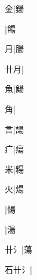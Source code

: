 \begin{multicols}{2}
{{\cjk{}{\cnsym{}　}{\cnsym{}　}金}|{\cjk{}鍚}\par
{}|{\cjk{}餳}\par
{\cjk{}{\cnsym{}　}{\cnsym{}　}月}|{\cjk{}腸}\par
{\cjk{}{\cnsym{}　}卄月}|{}\par
{\cjk{}{\cnsym{}　}{\cnsym{}　}魚}|{\cjk{}鰑}\par
{\cjk{}{\cnsym{}　}{\cnsym{}　}角}|{}\par
{\cjk{}{\cnsym{}　}{\cnsym{}　}言}|{\cjk{}諹}\par
{\cjk{}{\cnsym{}　}{\cnsym{}　}疒}|{\cjk{}瘍}\par
{\cjk{}{\cnsym{}　}{\cnsym{}　}米}|{\cjk{}糃}\par
{\cjk{}{\cnsym{}　}{\cnsym{}　}火}|{\cjk{}煬}\par
{}|{\cjk{}愓}\par
{}|{\cjk{}湯}\par
{\cjk{}{\cnsym{}　}卄{\cnxHanaA{}氵}}|{\cjk{}蕩}\par
{\cjk{}石卄{\cnxHanaA{}氵}}|{}\par
}
\end{multicols}
